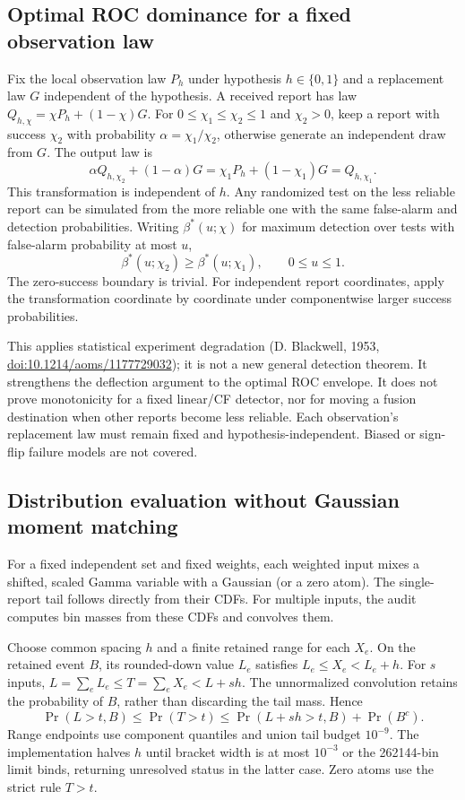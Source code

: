 \documentclass[10pt]{article}
\begin{document}
\subsection{Optimal ROC dominance for a fixed observation law}
Fix the local observation law $P_h$ under hypothesis $h\in\{0,1\}$ and a
replacement law $G$ independent of the hypothesis. A received report has law
$Q_{h,\chi}=\chi P_h+(1-\chi)G$. For
$0\le\chi_1\le\chi_2\le1$ and $\chi_2>0$, keep a report with success $\chi_2$
with probability $\alpha=\chi_1/\chi_2$, otherwise generate an independent
draw from $G$. The output law is
\[
 \alpha Q_{h,\chi_2}+(1-\alpha)G
 =\chi_1P_h+(1-\chi_1)G=Q_{h,\chi_1}.
\]
This transformation is independent of $h$. Any randomized test on the
less reliable report can be simulated from the more reliable one with the
same false-alarm and detection probabilities. Writing $\beta^*(u;\chi)$
for maximum detection over tests with false-alarm probability at most $u$,
\[
 \beta^*(u;\chi_2)\ge\beta^*(u;\chi_1),\qquad 0\le u\le1.
\]
The zero-success boundary is trivial. For independent report coordinates,
apply the transformation coordinate by coordinate under componentwise
larger success probabilities.

This applies statistical experiment degradation (D. Blackwell, 1953,
\href{https://doi.org/10.1214/aoms/1177729032}{doi:10.1214/aoms/1177729032});
it is not a new general detection theorem. It strengthens the deflection
argument to the optimal ROC envelope. It does not prove monotonicity for
a fixed linear/CF detector, nor for moving a fusion destination when other
reports become less reliable. Each observation's replacement law must
remain fixed and hypothesis-independent. Biased or sign-flip failure
models are not covered.

\subsection{Distribution evaluation without Gaussian moment matching}
For a fixed independent set and fixed weights, each weighted input mixes
a shifted, scaled Gamma variable with a Gaussian (or a zero atom).
The single-report tail follows directly from their CDFs. For multiple
inputs, the audit computes bin masses from these CDFs and convolves them.

Choose common spacing $h$ and a finite retained range for each $X_e$.
On the retained event $B$, its rounded-down value $L_e$ satisfies
$L_e\le X_e<L_e+h$. For $s$ inputs,
$L=\sum_eL_e\le T=\sum_eX_e<L+sh$. The unnormalized convolution retains
the probability of $B$, rather than discarding the tail mass. Hence
\[
 \Pr(L>t,B)\le\Pr(T>t)
 \le\Pr(L+sh>t,B)+\Pr(B^c).
\]
Range endpoints use component quantiles and union tail budget $10^{-9}$.
The implementation halves $h$ until bracket width is at most $10^{-3}$
or the 262144-bin limit binds, returning unresolved status in the latter case.
Zero atoms use the strict rule $T>t$.
\end{document}
